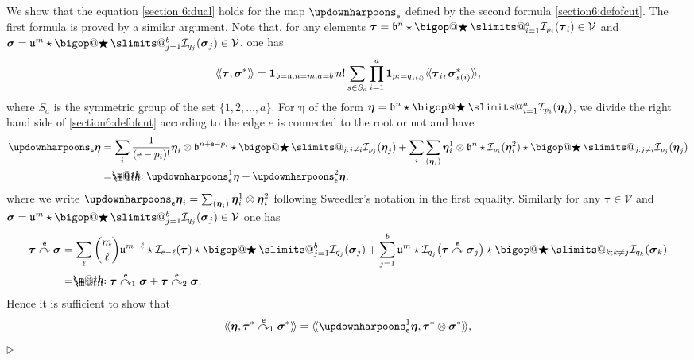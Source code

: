 \documentclass[10pt, reqno]{amsart}
\makeatletter
\numberwithin{subsection}{section}
\numberwithin{subsubsection}{subsection}
\numberwithin{equation}{section} %
\newenvironment{Dem}[1][\unskip]{%
    \begin{list}{\hspace{1.15cm}{\sf \textbf{{\small Proof #1 --}}}}{%
        \setlength{\topsep}{0pt}%
        \setlength{\leftmargin}{0pt}%
        \setlength{\rightmargin}{0pt}%
        \setlength{\listparindent}{0pt}%
        \setlength{\itemindent}{0pt}%
        \setlength{\parsep}{0pt}%
        \addtolength{\leftmargin}{0pt}%
        \addtolength{\rightmargin}{0pt}%
    } \item }{\hfill $\rhd$\end{list}\smallskip}
\theoremstyle{mystyle}
\theoremstyle{mystyle2}
\theoremstyle{mystyle3}
\DeclareRobustCommand\bigop[1]{%
  \mathop{\vphantom{\sum}\mathpalette\bigop@{#1}}\slimits@
}
\newcommand{\bigop@}[2]{%
  \vcenter{%
    \sbox\z@{$#1\sum$}%
    \hbox{\resizebox{\ifx#1\displaystyle.9\fi\dimexpr\ht\z@+\dp\z@}{!}{$\m@th#2$}}%
  }%
}
\newcommand{\Bigstar}{\DOTSB\bigop{\bigstar}}
\newcommand{\bstau}{\boldsymbol{\tau}}
\newcommand{\bssigma}{\boldsymbol{\sigma}}
\newcommand{\bseta}{\boldsymbol{\eta}}
\newcommand{\wangle}[1]{\langle\!\langle#1\rangle\!\rangle}
\newcommand{\grafting}{\overset{\sf e}{\curvearrowright}}
\newcommand{\rootgrafting}{\overset{\sf e}{\curvearrowright}_1}
\newcommand{\nonrootgrafting}{\overset{\sf e}{\curvearrowright}_2}
\newcommand{\ssk}{\smallskip}
\newcommand{\mcI}{\mathcal{I}}
\newcommand\mcV{\mathcal V}
\newcommand*{\eqdef}{=\mathrel{\rlap{%
                     \raisebox{0.3ex}{$\m@th\cdot$}}%
                     \raisebox{-0.3ex}{$\m@th\cdot$}}%
                     }
\makeatother
\begin{document}
\ssk

\begin{Dem}
We show that the equation \eqref{section 6:dual} holds for the map $\updownharpoons_{\sf e}$ defined by the second formula \eqref{section6:defofcut}. The first formula is proved by a similar argument. Note that, for any elements $\bstau=\frak{b}^n\star\Bigstar_{i=1}^a\mcI_{p_i}(\bstau_i)\in \mcV$ and $\bssigma=\frak{u}^{m}\star\Bigstar_{j=1}^b\mcI_{q_j}(\bssigma_j)\in \mcV$, one has
\begin{align}\label{section 6:general inner product}
\wangle{\bstau,\bssigma^*}=
{\bf1}_{\frak{b}=\frak{u},n=m,a=b}\, n!\sum_{s\in S_a}\prod_{i=1}^a{\bf1}_{p_i=q_{s(i)}}\wangle{\bstau_i,\bssigma_{s(i)}^*},
\end{align}
where $S_a$ is the symmetric group of the set $\{1,2,\dots,a\}$. For $\bseta$ of the form $\bseta={\frak{b}}^n\star\Bigstar_{i=1}^a\mcI_{p_i}(\bseta_i)$, 
we divide the right hand side of \eqref{section6:defofcut} according to the edge $e$ is connected to the root or not and have
\begin{align*}
\updownharpoons_{\sf e}\bseta
&=\sum_i\frac1{({\sf e}-p_i)!}\bseta_i
\otimes \frak{b}^{n+{\sf e}-p_i}
\star\Bigstar_{j:j\neq i}\mcI_{p_j}(\bseta_j)
+\sum_i\sum_{(\bseta_i)} \bseta_i^1\otimes \frak{b}^n\star\mcI_{p_i}(\bseta_i^2)
\star\Bigstar_{j:j\neq i}\mcI_{p_j}(\bseta_j)\\
&\eqdef \updownharpoons_{\sf e}^1\bseta+\updownharpoons_{\sf e}^2\bseta,
\end{align*}
where we write $\updownharpoons_{\sf e}\bseta_i=\sum_{(\bseta_i)}\bseta_i^1\otimes\bseta_i^2$ following Sweedler's notation in the first equality. Similarly for any $\bstau\in\mcV$ and $\bssigma=\frak{u}^{m}\star\Bigstar_{j=1}^b\mcI_{q_j}(\bssigma_j)\in \mcV$ one has
\begin{align*}
\bstau\grafting\bssigma
&= \sum_\ell\binom{m}{\ell}
\frak{u}^{m-\ell}\star\mcI_{{\sf e}-\ell}(\bstau) \star\Bigstar_{j=1}^b \mcI_{q_j}(\bssigma_j)
+ \sum_{j=1}^b\frak{u}^m\star\mcI_{q_j}\big(\bstau\grafting\bssigma_j\big)
\star\Bigstar_{k;k\neq j}\mcI_{q_k}(\bssigma_k)  \\
&\eqdef \bstau\rootgrafting\bssigma + \bstau\nonrootgrafting\bssigma.
\end{align*}
Hence it is sufficient to show that
\begin{align}
\label{section 6:dual1}\wangle{\bseta, \bstau^*\rootgrafting\bssigma^*} 
&= \wangle{\updownharpoons_{\sf e}^1\bseta, \bstau^*\otimes\bssigma^*}, 
  \\

\end{align}
\end{Dem}
\end{document}
